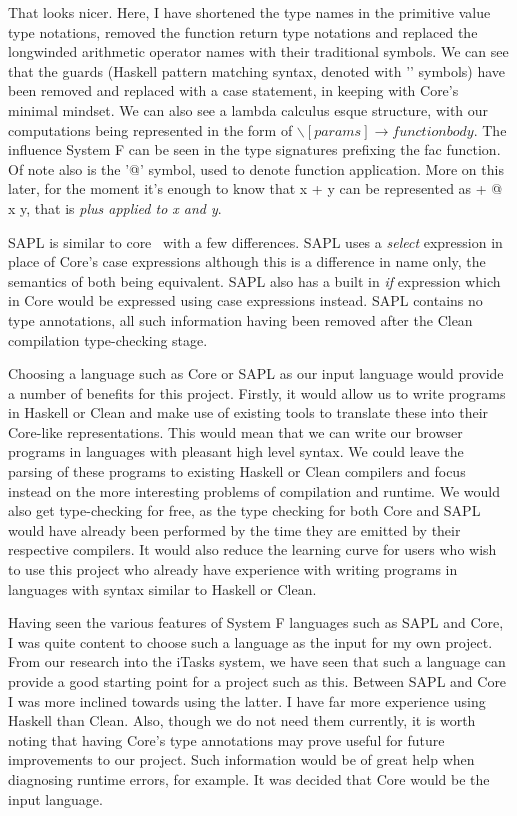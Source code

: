 \noindent That looks nicer. Here, I have shortened the type names in the
primitive value type notations, removed the function return type notations
and replaced the longwinded arithmetic operator names with their traditional
symbols. We can see that the guards (Haskell pattern matching syntax, denoted
with '\textbar' symbols) have been removed and replaced with a case statement, in
keeping with Core's minimal mindset. We can also see a lambda calculus esque
structure, with our computations being represented in the form of \( \backslash
 [params] \rightarrow function body\). The influence System F can be seen in
 the type signatures prefixing the fac function. Of note also is the '@' symbol, used
 to denote function application. More on this later, for the moment it's enough
 to know that x + y can be represented as + @ x y, that is \emph{plus applied to
 x and y}.
 
SAPL is similar to core~\cite[pp.5]{SAPL2JS} with a few differences. SAPL uses a \emph{select} 
expression in place of Core's case expressions although this is a difference in name
only, the semantics of both being equivalent. SAPL also has a built in \emph{if}
expression which in Core would be expressed using case expressions instead. SAPL
contains no type annotations, all such information having been removed after the
Clean compilation type-checking stage.

Choosing a language such as Core or SAPL as our input language would provide
a number of benefits for this project. Firstly, it would allow us to write
programs in Haskell or Clean and make use of existing tools to translate these
into their Core-like representations. This would mean that we can write our browser
programs in languages with pleasant high level syntax. We could leave the 
parsing of these programs to existing Haskell or Clean compilers and focus 
instead on the more interesting problems of compilation and runtime. We would
also get type-checking for free, as the type checking for both Core and SAPL 
would have already been performed by the time they are emitted by their respective
compilers. It would also reduce the learning curve for users who wish to use
this project who already have experience with writing programs in languages
with syntax similar to Haskell or Clean.
 
Having seen the various features of System F languages such as SAPL and Core, I
was quite content to choose such a language as the input for my own project. 
From our research into the iTasks system, we have seen that such a language 
can provide a good starting point for a project such as this. Between SAPL and
Core I was more inclined towards using the latter. I have far more experience
using Haskell than Clean. Also, though we do not need them currently, it is
worth noting that having Core's type annotations may prove useful for future
improvements to our project. Such information would be of great help when 
diagnosing runtime errors, for example. It was decided that Core would be the
input language.

